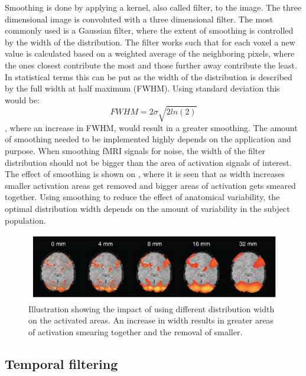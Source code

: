 Smoothing is done by applying a kernel, also called filter, to the image. The three dimensional image is convoluted with a three dimensional filter. The most commonly used is a Gaussian filter, where the extent of smoothing is controlled by the width of the distribution. The filter works such that for each voxel a new value is calculated based on a weighted average of the neighboring pixels, where the ones closest contribute the most and those further away contribute the least. In statistical terms this can be put as the width of the distribution is described by the full width at half maximum (FWHM). Using standard deviation this would be:
\begin{equation}
FWHM = 2\sigma\sqrt{2ln(2)}
\end{equation} 
, where an increase in FWHM, would result in a greater smoothing. The amount of smoothing needed to be implemented highly depends on the application and purpose. When smoothing fMRI signals for noise, the width of the filter distribution should not be bigger than the area of activation signals of interest. The effect of smoothing is shown on , where it is seen that as width increases smaller activation areas get removed and bigger areas of activation gets smeared together. 
Using smoothing to reduce the effect of anatomical variability, the optimal distribution width depends on the amount of variability in the subject population. \cite{Poldrack2011}
  

\begin{figure}[H]                 
	\includegraphics[width=.8\textwidth]{figures/aBackground/smooth}  
	\caption{Illustration showing the impact of using different distribution width on the activated areas. An increase in width results in greater areas of activation smearing together and the removal of smaller. \cite{Poldrack2011}}
	\label{fig:back:smooth} 
\end{figure}  

\subsection{Temporal filtering}

